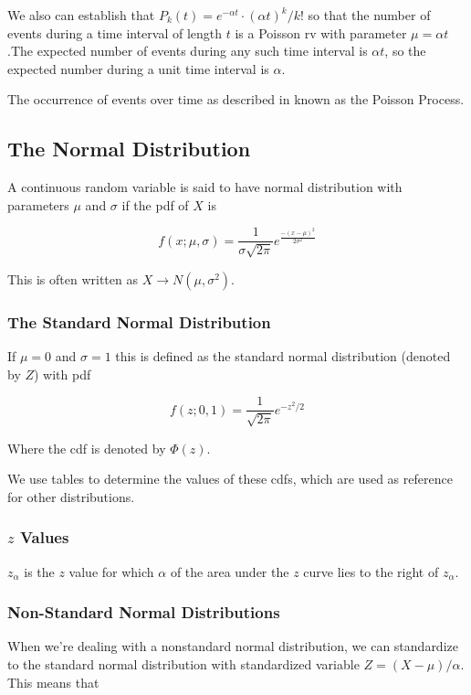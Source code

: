     We also can establish that $P_k(t) = e^{-\alpha t} \cdot {(\alpha t)}^k/k!$ so that the number of events during a
    time interval of length $t$ is a Poisson rv with parameter $\mu = \alpha t$.The expected number of events during any
    such time interval is $\alpha t$, so the expected number during a unit time interval is $\alpha$.

    The occurrence of events over time as described in known as the Poisson Process.



    \subsection{The Normal Distribution}
    A continuous random variable is said to have normal distribution with parameters $\mu$ and $\sigma$ if the pdf of $X$ is

        \[ f(x; \mu, \sigma) = \frac{1}{\sigma \sqrt{2\pi}} e^{\frac{-{(x-\mu)}^2}{2\sigma^2}} \]

    This is often written as $X \to N(\mu, \sigma^2)$.

        \subsubsection{The Standard Normal Distribution}
        If $\mu = 0$ and $\sigma=1$ this is defined as the standard normal distribution (denoted by $Z$) with pdf

            \[ f(z;0,1) = \frac{1}{\sqrt{2\pi}} e^{-z^2/2} \]

        Where the cdf is denoted by $\Phi(z)$.

        We use tables to determine the values of these cdfs, which are used as reference for other distributions.

        \subsubsection{$z$ Values}
        $z_\alpha$ is the $z$ value for which $\alpha$ of the area under the $z$ curve lies to the right of $z_\alpha$.

        \subsubsection{Non-Standard Normal Distributions}
        When we're dealing with a nonstandard normal distribution, we can standardize to the standard normal distribution
        with standardized variable $Z = (X - \mu)/\alpha$. This means that

